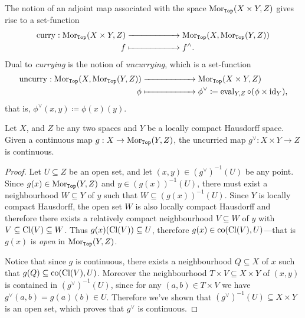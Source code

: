 The notion of an adjoint map associated with the space \(\operatorname{Mor}_{{\texttt{Top}}}(X \times Y,
Z)\) gives rise to a set-function
\begin{align*}
    \operatorname{curry}: \operatorname{Mor}_{{\texttt{Top}}}(X \times Y, Z)
      & \xrightarrow{\hspace*{2cm}} \operatorname{Mor}_{{\texttt{Top}}}(X, \operatorname{Mor}_{{\texttt{Top}}}(Y, Z)) \\
    f & \xmapsto{\hspace*{2cm}} f^{\wedge}.
\end{align*}
Dual to \emph{currying} is the notion of \emph{uncurrying}, which is a
set-function
\begin{align*}
    \operatorname{uncurry}: \operatorname{Mor}_{{\texttt{Top}}}(X, \operatorname{Mor}_{{\texttt{Top}}}(Y, Z))
         & \xrightarrow{\hspace*{2cm}} \operatorname{Mor}_{{\texttt{Top}}}(X \times Y, Z) \\
    \phi & \xmapsto{\hspace*{2cm}}
    \phi^{\vee} \coloneq \operatorname{eval}_{Y, Z} \circ (\phi \times \operatorname{id}_Y),
\end{align*}
that is, \(\phi^{\vee}(x, y) \coloneq \phi(x)(y)\).

\begin{proposition}
    \label{prop:uncurrying-continuous}
    Let \(X\), and \(Z\) be any two spaces and \(Y\) be a locally compact Hausdorff
    space. Given a continuous map \(g: X \to \operatorname{Mor}_{{\texttt{Top}}}(Y, Z)\), the uncurried
    map \(g^{\vee}: X \times Y \to Z\) is continuous.
\end{proposition}

\begin{proof}
    Let \(U \subseteq Z\) be an open set, and let \((x, y) \in (g^{\vee})^{-1}(U)\)
    be any point. Since \(g(x) \in \operatorname{Mor}_{{\texttt{Top}}}(Y, Z)\) and \(y \in (g(x))^{-1}(U)\),
    there must exist a neighbourhood \(W \subseteq Y\) of \(y\) such that
    \(W \subseteq (g(x))^{-1}(U)\). Since \(Y\) is locally compact Hausdorff, the
    open set \(W\) is also locally compact Hausdorff and therefore there exists a
    relatively compact neighbourhood \(V \subseteq W\) of \(y\) with
    \(V \subseteq \operatorname{Cl}(V) \subseteq W\). Thus \(g(x)(\operatorname{Cl}(V)) \subseteq U\), therefore
    \(g(x) \in \operatorname{co}(\operatorname{Cl}(V), U)\)---that is \(g(x)\) is \emph{open} in
    \(\operatorname{Mor}_{{\texttt{Top}}}(Y, Z)\).

    Notice that since \(g\) is continuous, there exists a neighbourhood
    \(Q \subseteq X\) of \(x\) such that \(g(Q) \subseteq \operatorname{co}(\operatorname{Cl}(V), U)\). Moreover
    the neighbourhood \(T \times V \subseteq X \times Y\) of \((x, y)\) is contained
    in \((g^{\vee})^{-1}(U)\), since for any \((a, b) \in T \times V\) we have
    \(g^{\vee}(a, b) = g(a)(b) \in U\). Therefore we've shown that
    \((g^{\vee})^{-1}(U) \subseteq X \times Y\) is an open set, which proves that
    \(g^{\vee}\) is continuous.
\end{proof}

